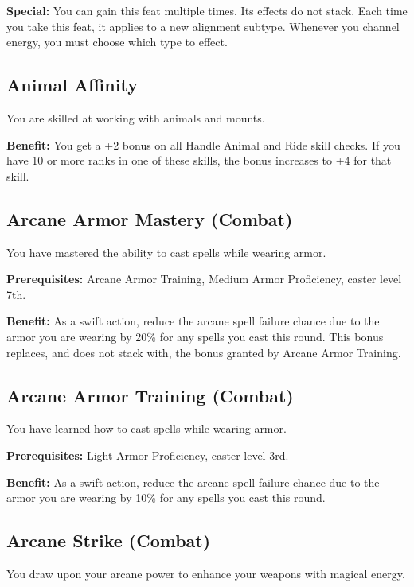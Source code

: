\textbf{Special:} You can gain this feat multiple times. Its effects do not stack. Each time you take this feat, it applies to a new alignment subtype. Whenever you channel energy, you must choose which type to effect.
				
\subsection{Animal Affinity}

				
You are skilled at working with animals and mounts.
				
\textbf{Benefit:} You get a +2 bonus on all Handle Animal and Ride skill checks. If you have 10 or more ranks in one of these skills, the bonus increases to +4 for that skill.
				
\subsection{Arcane Armor Mastery (Combat)}

				
You have mastered the ability to cast spells while wearing armor.
				
\textbf{Prerequisites:} Arcane Armor Training, Medium Armor Proficiency, caster level 7th.
				
\textbf{Benefit:} As a swift action, reduce the arcane spell failure chance due to the armor you are wearing by 20\% for any spells you cast this round. This bonus replaces, and does not stack with, the bonus granted by Arcane Armor Training.
				
\subsection{Arcane Armor Training (Combat)}

				
You have learned how to cast spells while wearing armor.
				
\textbf{Prerequisites:} Light Armor Proficiency, caster level 3rd.
				
\textbf{Benefit:} As a swift action, reduce the arcane spell failure chance due to the armor you are wearing by 10\% for any spells you cast this round.
				
\subsection{Arcane Strike (Combat)}

				
You draw upon your arcane power to enhance your weapons with magical energy.
				
